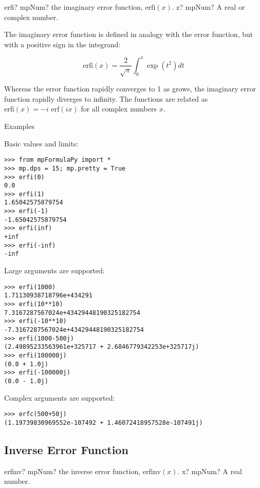 \begin{mpFunctionsExtract}
	\mpFunctionOne
	{erfi? mpNum? the imaginary error function, $\text{erfi}(x)$.}
	{z? mpNum? A real or complex number.}
\end{mpFunctionsExtract}

\vpara
The imaginary error function is defined in analogy with the error function, but with a positive sign in the integrand:

\begin{equation}
\text{erfi}(x) = \frac{2}{\sqrt{\pi}} \int_0^x \exp(t^2)dt
\end{equation}


Whereas the error function rapidly converges to 1 as grows, the imaginary error function rapidly diverges to infinity. The functions are related as $\text{erfi}(x)=-i\text{ erf}(ix)$ for all complex numbers $x$.

\vpara
Examples

Basic values and limits:

\begin{lstlisting}
>>> from mpFormulaPy import *
>>> mp.dps = 15; mp.pretty = True
>>> erfi(0)
0.0
>>> erfi(1)
1.65042575879754
>>> erfi(-1)
-1.65042575879754
>>> erfi(inf)
+inf
>>> erfi(-inf)
-inf
\end{lstlisting}

Large arguments are supported:

\begin{lstlisting}
>>> erfi(1000)
1.71130938718796e+434291
>>> erfi(10**10)
7.3167287567024e+43429448190325182754
>>> erfi(-10**10)
-7.3167287567024e+43429448190325182754
>>> erfi(1000-500j)
(2.49895233563961e+325717 + 2.6846779342253e+325717j)
>>> erfi(100000j)
(0.0 + 1.0j)
>>> erfi(-100000j)
(0.0 - 1.0j)
\end{lstlisting}

Complex arguments are supported:

\begin{lstlisting}
>>> erfc(500+50j)
(1.19739830969552e-107492 + 1.46072418957528e-107491j)
\end{lstlisting}



\subsection{Inverse Error Function}

\begin{mpFunctionsExtract}
	\mpFunctionOne
	{erfinv? mpNum? the inverse error function, $\text{erfinv}(x)$.}
	{x? mpNum? A real number.}
\end{mpFunctionsExtract}

